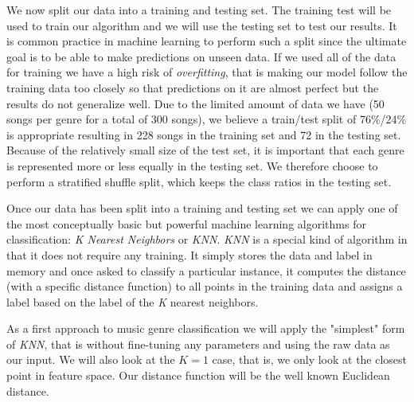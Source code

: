 \documentclass[12pt]{article}
\begin{document}
We now split our data into a training and testing set. The training test will be used to train our algorithm and we will use the testing set to test our results. It is common practice in machine learning to perform such a split since the ultimate goal is to be able to make predictions on unseen data. If we used all of the data for training we have a high risk of \textit{overfitting}, that is making our model follow the training data too closely so that predictions on it are almost perfect but the results do not generalize well. Due to the limited amount of data we have (50 songs per genre for a total of 300 songs), we believe a train/test split of 76\%/24\% is appropriate resulting in 228 songs in the training set and  72 in the testing set. Because of the relatively small size of the test set, it is important that each genre is represented more or less equally in the testing set. We therefore choose to perform a stratified shuffle split, which keeps the class ratios in the testing set.
\medskip

Once our data has been split into a training and testing set we can apply one of the most conceptually basic but powerful machine learning algorithms for classification: \textit{K Nearest Neighbors} or \textit{KNN}. \textit{KNN} is a special kind of algorithm in that it does not require any training. It simply stores the data and label in memory and once asked to classify a particular instance, it computes the distance (with a specific distance function) to all points in the training data and assigns a label based on the label of the \textit{K} nearest neighbors. 
\medskip

As a first approach to music genre classification we will apply the "simplest" form of \textit{KNN}, that is without fine-tuning any parameters and using the raw data as our input. We will also look at the $K=1$ case, that is, we only look at the closest point in feature space. Our distance function will be the well known Euclidean distance. 
\medskip
\end{document}
